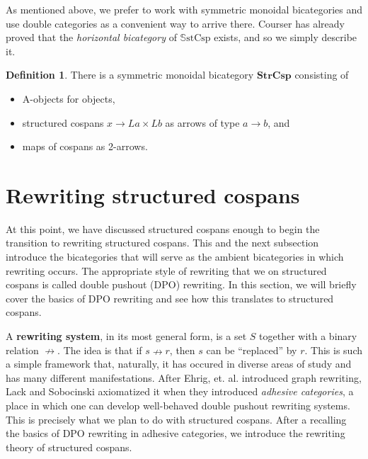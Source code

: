 \documentclass{amsart}
\newcommand{\A}{\cat{A}}
\newcommand{\SStrCsp}{\bicat{StrCsp}}
\newcommand{\SSStrCsp}{\mathbb{S}\cat{stCsp}}
\newcommand{\defn}[1]{\textbf{#1}}
\newcommand{\cat}[1]{\mathrm{#1}}
\newcommand{\bicat}[1]{\mathbf{#1}}
\newcommand{\rel}{\nrightarrow}
\newcommand{\csp}[3]{#2 \to #1 \times #3}
\theoremstyle{remark}
\theoremstyle{definition}
\newtheorem{definition}[theorem]{Definition}
\begin{document}
As mentioned above, we prefer to work with symmetric monoidal bicategories and use double
categories as a convenient way to arrive there.  Courser
%
%
has already proved that the \emph{horizontal bicategory} of $ \SSStrCsp
$ exists, and so we simply describe it.

\begin{definition}

  There is a symmetric monoidal bicategory $ \SStrCsp $ consisting of
  \begin{itemize}
  \item $ \A $-objects for objects,
  \item structured cospans $ \csp{La}{x}{Lb} $ as arrows of type $ a
    \to b $, and
  \item maps of cospans as 2-arrows.    
  \end{itemize}
  
\end{definition}


\section{Rewriting structured cospans}
\label{sec:rewriting-strcsp}

At this point, we have discussed structured cospans enough to begin
the transition to rewriting structured cospans. This and the next
subsection introduce the bicategories that will serve as the ambient
bicategories in which rewriting occurs.  The appropriate style of
rewriting that we on structured cospans is called double pushout (DPO)
rewriting. In this section, we will briefly cover the basics of DPO
rewriting and see how this translates to structured cospans.

A \defn{rewriting system}, in its most general form, is a set $ S $
together with a binary relation $ \rel $. The idea is that
if $ s \rel r$, then $ s $ can be ``replaced'' by $ r
$. This is such a simple framework that, naturally, it has occured in
diverse areas of study and has many different manifestations.  After
Ehrig, et. al.
%
%
introduced graph rewriting, Lack and Sobocinski axiomatized it when
they introduced \emph{adhesive categories},
%
%
a place in which one can develop well-behaved double pushout rewriting
systems. This is precisely what we plan to do with structured
cospans. After a recalling the basics of DPO rewriting in adhesive
categories, we introduce the rewriting theory of structured cospans.
\end{document}
